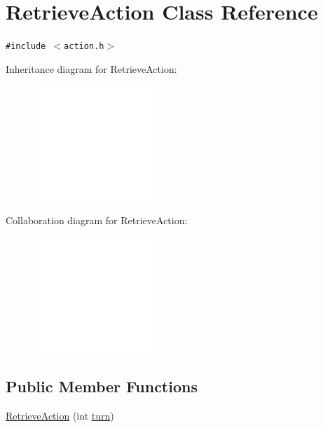 \hypertarget{classRetrieveAction}{
\section{RetrieveAction Class Reference}
\label{classRetrieveAction}
}
{\tt \#include $<$action.h$>$}

Inheritance diagram for RetrieveAction:\nopagebreak
\begin{figure}[H]
\begin{center}
\leavevmode
\includegraphics[width=126pt]{classRetrieveAction__inherit__graph}
\end{center}
\end{figure}
Collaboration diagram for RetrieveAction:\nopagebreak
\begin{figure}[H]
\begin{center}
\leavevmode
\includegraphics[width=126pt]{classRetrieveAction__coll__graph}
\end{center}
\end{figure}
\subsection*{Public Member Functions}
\begin{CompactItemize}
\item 
\hyperlink{classRetrieveAction_f17af7ee02f88f2af7e30ab4635d5c11}{RetrieveAction} (int \hyperlink{classAction_51e5d56a6aa4a037e90df19587a225c7}{turn})
\end{CompactItemize}


